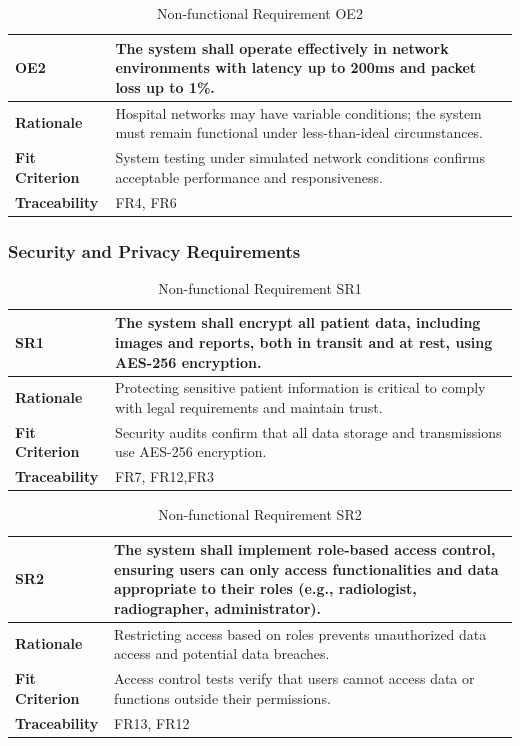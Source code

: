 \documentclass[12pt]{article}
\begin{document}
\begin{table}[h!]
\centering
{}
\begin{tabular}{|p{3.5cm}|p{11.5cm}|}
\hline
\rowcolor{gray!30}
\textbf{OE2} & The system shall operate effectively in network environments with latency up to 200ms and packet loss up to 1\%. \\
\hline
\textbf{Rationale} & Hospital networks may have variable conditions; the system must remain functional under less-than-ideal circumstances. \\
\hline
\textbf{Fit Criterion} & System testing under simulated network conditions confirms acceptable performance and responsiveness. \\
\hline
\textbf{Traceability} & FR4, FR6 \\
\hline
\end{tabular}
\caption{Non-functional Requirement OE2}
\end{table}
\subsubsection{Security and Privacy Requirements}

\begin{table}[h!]
\centering
{}
\begin{tabular}{|p{3.5cm}|p{11.5cm}|}
\hline
\rowcolor{gray!30}
\textbf{SR1} & The system shall encrypt all patient data, including images and reports, both in transit and at rest, using AES-256 encryption. \\
\hline
\textbf{Rationale} & Protecting sensitive patient information is critical to comply with legal requirements and maintain trust. \\
\hline
\textbf{Fit Criterion} & Security audits confirm that all data storage and transmissions use AES-256 encryption. \\
\hline
\textbf{Traceability} & FR7, FR12,FR3 \\
\hline
\end{tabular}
\caption{Non-functional Requirement SR1}
\end{table}

\begin{table}[h!]
\centering
{}
\begin{tabular}{|p{3.5cm}|p{11.5cm}|}
\hline
\rowcolor{gray!30}
\textbf{SR2} & The system shall implement role-based access control, ensuring users can only access functionalities and data appropriate to their roles (e.g., radiologist, radiographer, administrator). \\
\hline
\textbf{Rationale} & Restricting access based on roles prevents unauthorized data access and potential data breaches. \\
\hline
\textbf{Fit Criterion} & Access control tests verify that users cannot access data or functions outside their permissions. \\
\hline
\textbf{Traceability} & FR13, FR12 \\
\hline
\end{tabular}
\caption{Non-functional Requirement SR2}
\end{table}
\newpage
\end{document}

